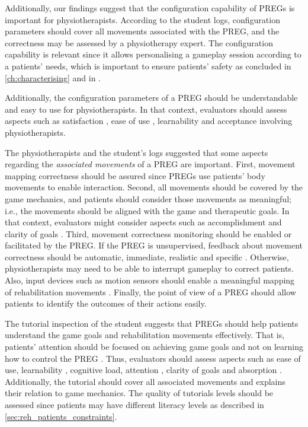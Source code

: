 Additionally, our findings suggest that the configuration capability of \acp{PREG} is important for physiotherapists. According to the student logs, configuration parameters should cover all movements associated with the \ac{PREG}, and the correctness may be assessed by a physiotherapy expert. The configuration capability is relevant since it allows personalising a gameplay session according to a patients' needs, which is important to ensure patients' safety as concluded in \autoref{ch:characterising} and in \autocite{Cameirao2010,Ni2014,Nijholt2008,Wiemeyer2015,Seo2016}.

Additionally, the configuration parameters of a \ac{PREG} should be understandable and easy to use for physiotherapists. In that context, evaluators should assess aspects such as satisfaction \autocite{Sanchez2009,Yanez-Gomez2017,Zhao2016}, ease of use \autocite{Cameirao2010,Moosajee,VandenAbeele2016}, learnability \autocite{Desurvire2009,GonzalezSanchez2009} and acceptance \autocite{Yanez-Gomez2017} involving physiotherapists.

The physiotherapists and the student's logs suggested that some aspects regarding the \textit{associated movements} of a \ac{PREG} are important. First, movement mapping correctness should be assured since \acp{PREG} use patients' body movements to enable interaction. Second, all movements should be covered by the game mechanics, and patients should consider those movements as meaningful; i.e., the movements should be aligned with the game and therapeutic goals. In that context, evaluators might consider aspects such as accomplishment \autocite{Cameirao2010,Zhao2016} and clarity of goals \autocite{Desurvire2009,VandenAbeele2016}. Third, movement correctness monitoring should be enabled or facilitated by the \ac{PREG}. If the \ac{PREG} is unsupervised, feedback about movement correctness should be automatic, immediate, realistic and specific \autocite{Pasch2009,PirovanoAdvisor2012,Wiemeyer2015}. Otherwise, physiotherapists may need to be able to interrupt gameplay to correct patients. Also, input devices such as motion sensors should enable a meaningful mapping of rehabilitation movements \autocite{Isbister2015}. Finally, the point of view of a \ac{PREG} should allow patients to identify the outcomes of their actions easily.

The tutorial inspection of the student suggests that \acp{PREG} should help patients understand the game goals and rehabilitation movements effectively. That is, patients' attention should be focused on achieving game goals and not on learning how to control the \ac{PREG} \autocite{Isbister2015,Sinclair2007}. Thus, evaluators should assess aspects such as ease of use, learnability \autocite{Desurvire2009,GonzalezSanchez2009}, cognitive load, attention \autocite{Fernandez2008}, clarity of goals \autocite{Desurvire2009,VandenAbeele2016} and absorption \autocite{Lapas2015}. Additionally, the tutorial should cover all associated movements and explains their relation to game mechanics. The quality of tutorials levels should be assessed since patients may have different literacy levels as described in \autoref{sec:reh_patients_constraints}.

